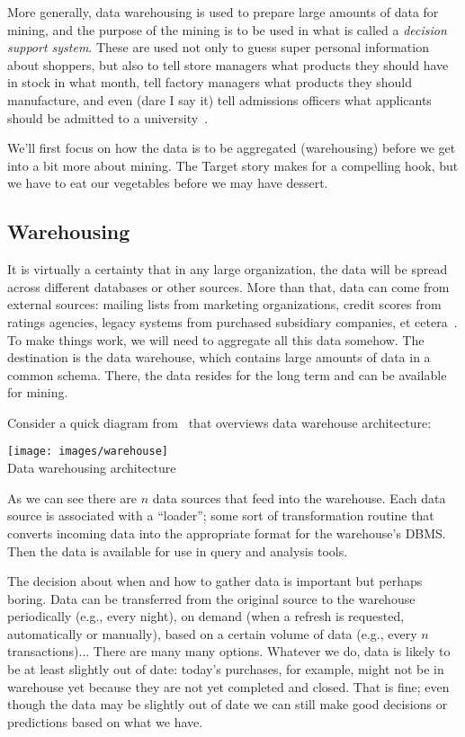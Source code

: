 \documentclass[a4paper]{report}
\begin{document}
More generally, data warehousing is used to prepare large amounts of data for mining, and the purpose of the mining is to be used in what is called a \textit{decision support system}. These are used not only to guess super personal information about shoppers, but also to tell store managers what products they should have in stock in what month, tell factory managers what products they should manufacture, and even (dare I say it) tell admissions officers what applicants should be admitted to a university~\cite{dsc}.

We'll first focus on how the data is to be aggregated (warehousing) before we get into a bit more about mining. The Target story makes for a compelling hook, but we have to eat our vegetables before we may have dessert.

\subsection*{Warehousing}

It is virtually a certainty that in any large organization, the data will be spread across different databases or other sources. More than that, data can come from external sources: mailing lists from marketing organizations, credit scores from ratings agencies, legacy systems from purchased subsidiary companies, et cetera~\cite{dsc}. To make things work, we will need to aggregate all this data somehow. The destination is the data warehouse, which contains large amounts of data in a common schema. There, the data resides for the long term and can be available for mining.

Consider a quick diagram from~\cite{dsc} that overviews data warehouse architecture: 

\begin{center}
\texttt{[image: images/warehouse]}\\
Data warehousing architecture~\cite{dsc}
\end{center}

As we can see there are $n$ data sources that feed into the warehouse. Each data source is associated with a ``loader''; some sort of transformation routine that converts incoming data into the appropriate format for the warehouse's DBMS. Then the data is available for use in query and analysis tools.

The decision about when and how to gather data is important but perhaps boring. Data can be transferred from the original source to the warehouse periodically (e.g., every night), on demand (when a refresh is requested, automatically or manually), based on a certain volume of data (e.g., every $n$ transactions)... There are many many options. Whatever we do, data is likely to be at least slightly out of date: today's purchases, for example, might not be in warehouse yet because they are not yet completed and closed. That is fine; even though the data may be slightly out of date we can still make good decisions or predictions based on what we have.
\end{document}
